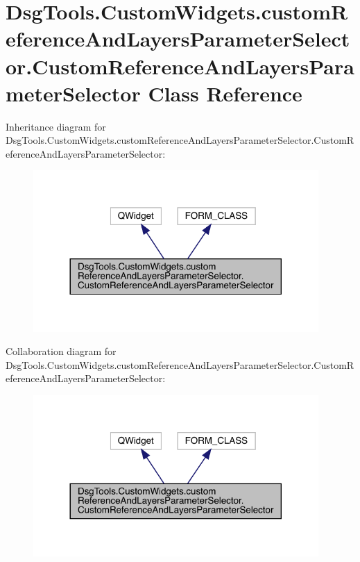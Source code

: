 \hypertarget{class_dsg_tools_1_1_custom_widgets_1_1custom_reference_and_layers_parameter_selector_1_1_custom_962aafd2d8f85861a2c944521ade35a6}{}\section{Dsg\+Tools.\+Custom\+Widgets.\+custom\+Reference\+And\+Layers\+Parameter\+Selector.\+Custom\+Reference\+And\+Layers\+Parameter\+Selector Class Reference}
\label{class_dsg_tools_1_1_custom_widgets_1_1custom_reference_and_layers_parameter_selector_1_1_custom_962aafd2d8f85861a2c944521ade35a6}


Inheritance diagram for Dsg\+Tools.\+Custom\+Widgets.\+custom\+Reference\+And\+Layers\+Parameter\+Selector.\+Custom\+Reference\+And\+Layers\+Parameter\+Selector\+:
\nopagebreak
\begin{figure}[H]
\begin{center}
\leavevmode
\includegraphics[width=308pt]{class_dsg_tools_1_1_custom_widgets_1_1custom_reference_and_layers_parameter_selector_1_1_custom_7a370e132f806928bfa2c1b4e9b3ff91}
\end{center}
\end{figure}


Collaboration diagram for Dsg\+Tools.\+Custom\+Widgets.\+custom\+Reference\+And\+Layers\+Parameter\+Selector.\+Custom\+Reference\+And\+Layers\+Parameter\+Selector\+:
\nopagebreak
\begin{figure}[H]
\begin{center}
\leavevmode
\includegraphics[width=308pt]{class_dsg_tools_1_1_custom_widgets_1_1custom_reference_and_layers_parameter_selector_1_1_custom_9a00d64fa4b687fc5922b24a2c66872a}
\end{center}
\end{figure}
